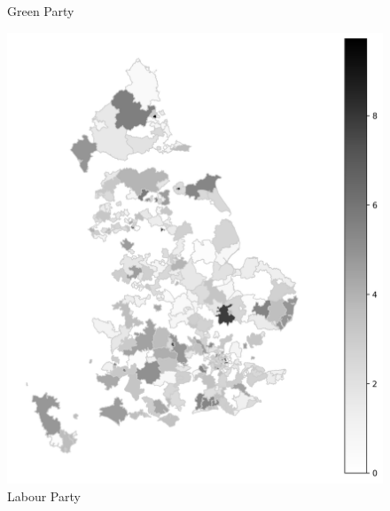 \documentclass[preprint]{elsarticle} %
\begin{document}
\begin{figure}[htbp]
\begin{minipage}[t]{0.335\textwidth}
		\caption{Green Party}
	\end{minipage}\hfill
	\begin{minipage}[t]{0.335\textwidth}
		\centering
		\includegraphics[width=\textwidth,height=0.68\textheight,keepaspectratio]{plots/LabourParty_2010GeneralElection_Environmental_Mentions.png}
		\caption{Labour Party}
	\end{minipage}
	
	\vspace{0.1cm}  %
	

\end{figure}
\end{document}
